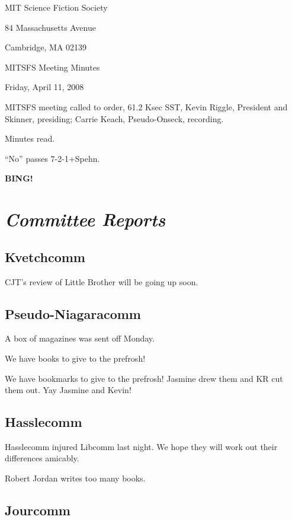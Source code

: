 \documentclass[10pt]{article}
\newcommand{\bing}{{\bf BING!} }
\newcommand{\goto}[1]{\bing \vskip 12pt \section*{{\em{#1}}}}
\begin{document}
\begin{center}

MIT Science Fiction Society

84 Massachusetts Avenue

Cambridge, MA 02139

\vspace{12pt}

MITSFS Meeting Minutes

Friday, April 11, 2008

\end{center}

\vspace{18pt}

\setlength{\parskip}{6pt}

\noindent
MITSFS meeting called to order, 61.2 Ksec SST,
Kevin Riggle, President and Skinner, presiding; Carrie Keach, 
Pseudo-Onseck, recording.

Minutes read.

``No'' passes 7-2-1+Spehn.

\BING

\goto{Committee Reports}

\subsection*{Kvetchcomm}

CJT's review of Little Brother will be going up soon. 

\subsection*{Pseudo-Niagaracomm}

A box of magazines was sent off Monday.

We have books to give to the prefrosh!

We have bookmarks to give to the prefrosh! Jasmine drew them and KR cut 
them out. Yay Jasmine and Kevin!

\subsection*{Hasslecomm}

Hasslecomm injured Libcomm last night. We hope they will work out their 
differences amicably.

Robert Jordan writes too many books.

\subsection*{Jourcomm}
\end{document}
